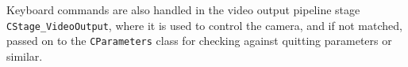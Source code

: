 Keyboard commands are also handled in the video output pipeline stage \texttt{CStage_VideoOutput}, where it is used to control the camera, and if not matched, passed on to the \texttt{CParameters} class for checking against quitting parameters or similar.


